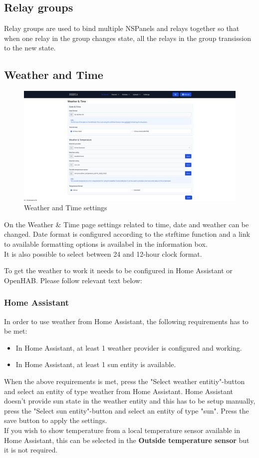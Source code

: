 \documentclass[10pt]{article}
\begin{document}
    \hypertarget{sec:relay_groups}{}
    \subsection{Relay groups}
    Relay groups are used to bind multiple NSPanels and relays together so that when one relay in the group changes state, all the relays in the group transission to the new state.


    \hypertarget{sec:weather_and_time}{}
    \subsection{Weather and Time}
    \begin{figure}[H]
    \centering
    \includegraphics[scale=0.25]{weather_and_time.png}
    \caption{Weather and Time settings}%
    \end{figure}
    On the Weather \& Time page settings related to time, date and weather can be changed. Date format is configured according to the strftime function and a link to available formatting options is availabel in the information box.
    \\It is also possible to select between 24 and 12-hour clock format.

    To get the weather to work it needs to be configured in Home Assistant or OpenHAB. Please follow relevant text below:
    \subsubsection{Home Assistant}
    In order to use weather from Home Assistant, the following requirements has to be met:
    \begin{itemize}
      \item In Home Assistant, at least 1 weather provider is configured and working.
      \item In Home Assistant, at least 1 sun entity is available.
    \end{itemize}
    When the above requirements is met, press the "Select weather entitiy"-button and select an entity of type weather from Home Assistant.  
    Home Assistant doesn't provide sun state in the weather entity and this has to be setup manually, press the "Select sun entity"-button and select an entity of type "sun".  
    Press the save button to apply the settings.
    \\
    If you wish to show temperature from a local temperature sensor available in Home Assistant, this can be selected in the \textbf{Outside temperature sensor} but it is not required.
\end{document}
